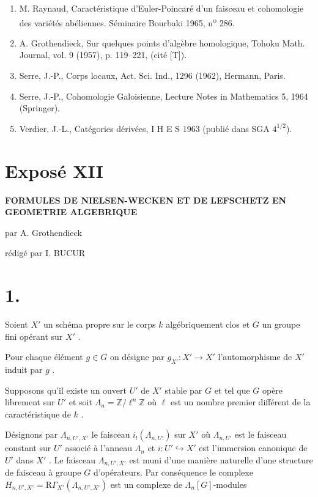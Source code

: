 \documentclass[11pt]{article}
\newcommand{\R}{\mathrm{R}}\newcommand{\RHomCore}{\mathrm{RHom}}
\providecommand{\R}{\mathrm R}
\providecommand{\La}{\Lambda}
\providecommand{\bZ}{\mathbb Z}
\begin{document}
\begin{enumerate}
\item[{[1]}] M. Raynaud, Caractéristique d'Euler-Poincaré d'un faisceau et cohomologie des variétés abéliennes. Séminaire Bourbaki 1965, n\textsuperscript{o} 286.
\item[{[2]}] A. Grothendieck, Sur quelques points d'algèbre homologique, Tohoku Math. Journal, vol. 9 (1957), p. 119--221, (cité [T]).
\item[{[3]}] Serre, J.-P., Corps locaux, Act. Sci. Ind., 1296 (1962), Hermann, Paris.
\item[{[4]}] Serre, J.-P., Cohomologie Galoisienne, Lecture Notes in Mathematics 5, 1964 (Springer).
\item[{[5]}] Verdier, J.-L., Catégories dérivées, I H E S 1963 (publié dans SGA $4^{1/2}$).
\end{enumerate}

\section*{Exposé XII}

\begin{center}
\Large\bf FORMULES DE NIELSEN-WECKEN ET DE LEFSCHETZ EN GEOMETRIE ALGEBRIQUE
\end{center}

\begin{center}
par A. Grothendieck

rédigé par I. BUCUR
\end{center}

\bigskip

\section*{1.}
Soient $X'$ un schéma propre sur le corps $k$ algébriquement clos et $G$ un groupe fini opérant sur $X'$ .

Pour chaque élément $g \in G$ on désigne par $g_{X'} : X' \to X'$ l'automorphisme de $X'$ induit par $g$ .

Supposons qu'il existe un ouvert $U'$ de $X'$ stable par $G$ et tel que $G$ opère librement sur $U'$ et soit $\La_n = \bZ/\ell^n\bZ$ où $\ell$ est un nombre premier différent de la caractéristique de $k$ .

Désignons par $\La_{n,U',X'}$ le faisceau $i_!(\La_{n,U'})$ sur $X'$ où $\La_{n,U'}$ est le faisceau constant sur $U'$ associé à l'anneau $\La_n$ et $i : U' \hookrightarrow X'$ est l'immersion canonique de $U'$ dans $X'$ . Le faisceau $\La_{n,U',X'}$ est muni d'une manière naturelle d'une structure de faisceau à groupe $G$ d'opérateurs. Par conséquence le complexe $H_{n,U',X'} = \R\Gamma_{X'}(\La_{n,U',X'})$ est un complexe de $\La_n[G]$-modules%
\end{document}
